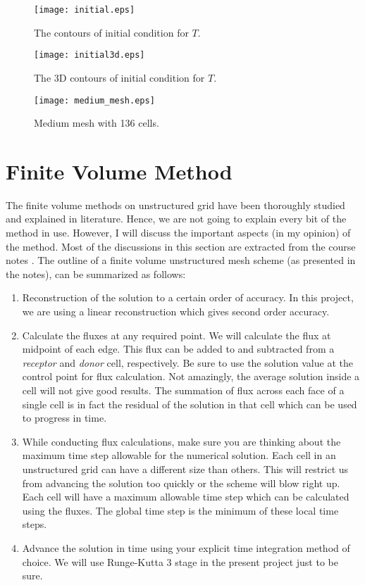 \documentclass{article}
\begin{document}
\begin{figure}[H]
\centering
\texttt{[image: initial.eps]}
\caption{The contours of initial condition for $T$.}
\label{fig_initial_1}
\end{figure}

\begin{figure}[H]
\centering
\texttt{[image: initial3d.eps]}
\caption{The 3D contours of initial condition for $T$.}
\label{fig_initial_2}
\end{figure}

\begin{figure}[H]
\centering
\texttt{[image: medium\_mesh.eps]}
\caption{Medium mesh with 136 cells.}
\label{fig_mesh_medium_1}
\end{figure}






\section{Finite Volume Method}
The finite volume methods on unstructured grid have been thoroughly studied and explained in literature. Hence, we are not going to explain every bit of the method in use. However, I will discuss the important aspects (in my opinion) of the method. Most of the discussions in this section are extracted from the course notes \cite{carl2020}. The outline of a finite volume unstructured mesh scheme (as presented in the notes), can be summarized as follows:
\begin{enumerate}
\item Reconstruction of the solution to a certain order of accuracy. In this project, we are using a linear reconstruction which gives second order accuracy.
\item Calculate the fluxes at any required point. We will calculate the flux at midpoint of each edge. This flux can be added to and subtracted from a \textit{receptor} and \textit{donor} cell, respectively. Be sure to use the solution value at the control point for flux calculation. Not amazingly, the average solution inside a cell will not give good results. The summation of flux across each face of a single cell is in fact the residual of the solution in that cell which can be used to progress in time.
\item While conducting flux calculations, make sure you are thinking about the maximum time step allowable for the numerical solution. Each cell in an unstructured grid can have a different size than others. This will restrict us from advancing the solution too quickly or the scheme will blow right up. Each cell will have a maximum allowable time step which can be calculated using the fluxes. The global time step is the minimum of these local time steps.
\item Advance the solution in time using your explicit time integration method of choice. We will use Runge-Kutta 3 stage in the present project just to be sure.
\end{enumerate}
\end{document}
